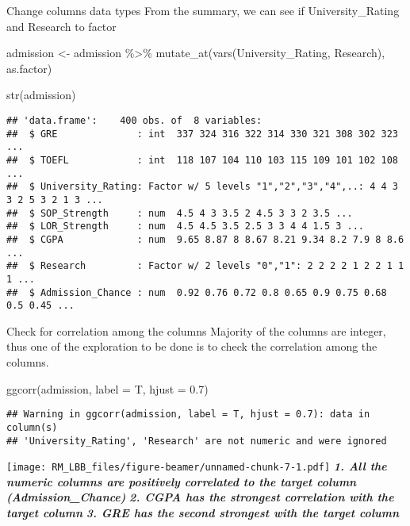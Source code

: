 \documentclass[
  ignorenonframetext,
]{beamer}
\newenvironment{Shaded}{\begin{snugshade}}{\end{snugshade}}
\newcommand{\AttributeTok}[1]{\textcolor[rgb]{0.77,0.63,0.00}{#1}}
\newcommand{\FloatTok}[1]{\textcolor[rgb]{0.00,0.00,0.81}{#1}}
\newcommand{\FunctionTok}[1]{\textcolor[rgb]{0.00,0.00,0.00}{#1}}
\newcommand{\NormalTok}[1]{#1}
\newcommand{\OtherTok}[1]{\textcolor[rgb]{0.56,0.35,0.01}{#1}}
\newcommand{\SpecialCharTok}[1]{\textcolor[rgb]{0.00,0.00,0.00}{#1}}
\begin{document}
\begin{frame}[fragile]{Change columns data types}
\protect\hypertarget{change-columns-data-types}{}
From the summary, we can see if University\_Rating and Research to
factor

\begin{Shaded}
\begin{Highlighting}[]
\NormalTok{admission }\OtherTok{\textless{}{-}} 
\NormalTok{  admission }\SpecialCharTok{\%\textgreater{}\%} 
  \FunctionTok{mutate\_at}\NormalTok{(}\FunctionTok{vars}\NormalTok{(University\_Rating, Research), as.factor)}

\FunctionTok{str}\NormalTok{(admission)}
\end{Highlighting}
\end{Shaded}

\begin{verbatim}
## 'data.frame':    400 obs. of  8 variables:
##  $ GRE              : int  337 324 316 322 314 330 321 308 302 323 ...
##  $ TOEFL            : int  118 107 104 110 103 115 109 101 102 108 ...
##  $ University_Rating: Factor w/ 5 levels "1","2","3","4",..: 4 4 3 3 2 5 3 2 1 3 ...
##  $ SOP_Strength     : num  4.5 4 3 3.5 2 4.5 3 3 2 3.5 ...
##  $ LOR_Strength     : num  4.5 4.5 3.5 2.5 3 3 4 4 1.5 3 ...
##  $ CGPA             : num  9.65 8.87 8 8.67 8.21 9.34 8.2 7.9 8 8.6 ...
##  $ Research         : Factor w/ 2 levels "0","1": 2 2 2 2 1 2 2 1 1 1 ...
##  $ Admission_Chance : num  0.92 0.76 0.72 0.8 0.65 0.9 0.75 0.68 0.5 0.45 ...
\end{verbatim}
\end{frame}

\begin{frame}[fragile]{Check for correlation among the columns}
\protect\hypertarget{check-for-correlation-among-the-columns}{}
Majority of the columns are integer, thus one of the exploration to be
done is to check the correlation among the columns.

\begin{Shaded}
\begin{Highlighting}[]
\FunctionTok{ggcorr}\NormalTok{(admission, }\AttributeTok{label =}\NormalTok{ T, }\AttributeTok{hjust =} \FloatTok{0.7}\NormalTok{)}
\end{Highlighting}
\end{Shaded}

\begin{verbatim}
## Warning in ggcorr(admission, label = T, hjust = 0.7): data in column(s)
## 'University_Rating', 'Research' are not numeric and were ignored
\end{verbatim}

\texttt{[image: RM\_LBB\_files/figure-beamer/unnamed-chunk-7-1.pdf]}
\textbf{\emph{1. All the numeric columns are positively correlated to
the target column (Admission\_Chance)}} \textbf{\emph{2. CGPA has the
strongest correlation with the target column}} \textbf{\emph{3. GRE has
the second strongest with the target column}}
\end{frame}
\end{document}
